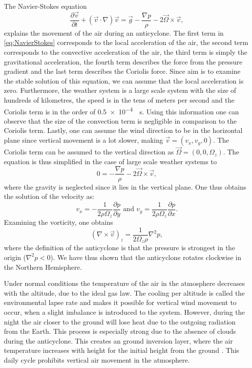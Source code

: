 The Navier-Stokes equation
\begin{equation} \frac{\partial \vec{v}}{\partial t} + (\vec{v} \cdot \nabla)\vec{v} = \vec{g} - \frac{\nabla p}{\rho} - 2\vec{\Omega} \times \vec{v}, \label{eq:NavierStokes} \end{equation}
explains the movement of the air during an anticyclone. The first term in \autoref{eq:NavierStokes} corresponds to the local acceleration of the air, the second term corresponds to the convective acceleration of the air, the third term is simply the gravitational acceleration, the fourth term describes the force from the pressure gradient and the last term describes the Coriolis force. Since aim is to examine the stable solution of this equation, we can assume that the local acceleration is zero. Furthermore, the weather system is a large scale system with the size of hundreds of kilometres, the speed is in the tens of meters per second and the Coriolis term is in the order of \SI{0.5e-4}{\per\s}. Using this information one can observe that the size of the convection term is negligible in comparison to the Coriolis term. Lastly, one can assume the wind direction to be in the horizontal plane since vertical movement is a lot slower, making $\vec{v}=(v_x,v_y,0)$. The Coriolis term can be assumed to the vertical direction as $\vec{\Omega}=(0,0,\Omega_z)$. The equation is thus simplified in the case of large scale weather systems to
\begin{equation} 0 = - \frac{\nabla p}{\rho} - 2{\vec{\Omega}} \times \vec{v}, \label{eq:NavierStokes2} \end{equation}
where the gravity is neglected since it lies in the vertical plane. One thus obtains the solution of the velocity as:
\begin{equation} v_x=-\frac{1}{2\rho\Omega_z}\frac{\partial p}{\partial y}\text{ and }v_y=\frac{1}{2\rho\Omega_z}\frac{\partial p}{\partial x}. 
\end{equation}
Examining the vorticity, one obtains  
\begin{equation}
    (\nabla \times \vec{v})_z  = \frac{1}{2\Omega_z\rho}\nabla^2p,
\end{equation} 
where the definition of the anticyclone is that the pressure is strongest in the origin ($\nabla^2p<0$). We have thus shown that the anticyclone rotates clockwise in the Northern Hemisphere. 

Under normal conditions the temperature of the air in the atmosphere decreases with the altitude, due to the ideal gas law. The cooling per altitude is called the environmental lapse rate and makes it possible for vertical wind movement to occur, when a slight imbalance is introduced to the system. However, during the night the air closer to the ground will lose heat due to the outgoing radiation from the Earth. This process is especially strong due to the absence of clouds during the anticyclone. This creates an ground inversion layer, where the air temperature increases with height for the initial height from the ground \cite{gregohareWeatherClimateClimate2005}. This daily cycle prohibits vertical air movement in the atmosphere.

